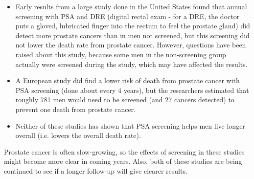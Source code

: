 \begin{itemize}

\item Early results from a large study done in the United States found that annual screening with PSA and DRE (digital rectal exam - for a DRE, the doctor puts a gloved, lubricated finger into the rectum to feel the prostate gland) did detect more prostate cancers than in men not screened, but this screening did not lower the death rate from prostate cancer. However, questions have been raised about this study, because some men in the non-screening group actually were screened during the study, which may have affected the results.

\item A European study did find a lower risk of death from prostate cancer with PSA screening (done about every 4 years), but the researchers estimated that roughly 781 men would need to be screened (and 27 cancers detected) to prevent one death from prostate cancer.

\item Neither of these studies has shown that PSA screening helps men live longer overall (i.e. lowers the overall death rate).

\end{itemize}

Prostate cancer is often slow-growing, so the effects of screening in these studies might become more clear in coming years. Also, both of these studies are being continued to see if a longer follow-up will give clearer results.


